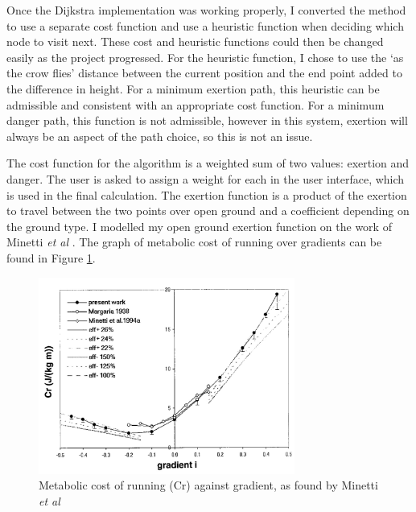 \documentclass[12pt,a4paper]{article}
\begin{document}
  \par Once the Dijkstra implementation was working properly, I converted the method to use a separate cost function and use a heuristic function when deciding which node to visit next. These cost and heuristic functions could then be changed easily as the project progressed. For the heuristic function, I chose to use the `as the crow flies' distance between the current position and the end point added to the difference in height. For a minimum exertion path, this heuristic can be admissible and consistent with an appropriate cost function. For a minimum danger path, this function is not admissible, however in this system, exertion will always be an aspect of the path choice, so this is not an issue.
  \par The cost function for the algorithm is a weighted sum of two values: exertion and danger. The user is asked to assign a weight for each in the user interface, which is used in the final calculation. The exertion function is a product of the exertion to travel between the two points over open ground and a coefficient depending on the ground type. I modelled my open ground exertion function on the work of Minetti \textit{et al} \citeyear{minetti2002energy}. The graph of metabolic cost of running over gradients can be found in Figure \ref{exertion_graph}.

  \begin{figure}[htb]
    \centering
    \includegraphics[width=0.75\textwidth]{exertion_graph}
    \caption{Metabolic cost of running (Cr) against gradient, as found by Minetti \textit{et al} \citeyear{minetti2002energy}}
    \label{exertion_graph}
  \end{figure}
\end{document}
